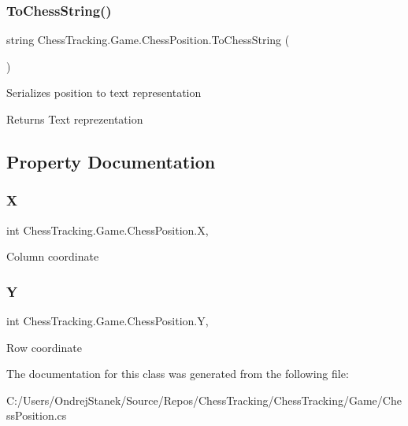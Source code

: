 \subsubsection{\texorpdfstring{ToChessString()}{ToChessString()}}
{\footnotesize\ttfamily string Chess\+Tracking.\+Game.\+Chess\+Position.\+To\+Chess\+String (\begin{DoxyParamCaption}{ }\end{DoxyParamCaption})}



Serializes position to text representation 

\begin{DoxyReturn}{Returns}
Text reprezentation
\end{DoxyReturn}


\subsection{Property Documentation}
\mbox{\label{class_chess_tracking_1_1_game_1_1_chess_position_a6900df7ad0744748c4b4da4452b9701a}} 
\subsubsection{\texorpdfstring{X}{X}}
{\footnotesize\ttfamily int Chess\+Tracking.\+Game.\+Chess\+Position.\+X\hspace{0.3cm}{\ttfamily [get]}, {\ttfamily [set]}}



Column coordinate 

\mbox{\label{class_chess_tracking_1_1_game_1_1_chess_position_a44dd6acdeb33707df6cc3d40119554ba}} 
\subsubsection{\texorpdfstring{Y}{Y}}
{\footnotesize\ttfamily int Chess\+Tracking.\+Game.\+Chess\+Position.\+Y\hspace{0.3cm}{\ttfamily [get]}, {\ttfamily [set]}}



Row coordinate 



The documentation for this class was generated from the following file\+:\begin{DoxyCompactItemize}
\item 
C\+:/\+Users/\+Ondrej\+Stanek/\+Source/\+Repos/\+Chess\+Tracking/\+Chess\+Tracking/\+Game/Chess\+Position.\+cs\end{DoxyCompactItemize}
